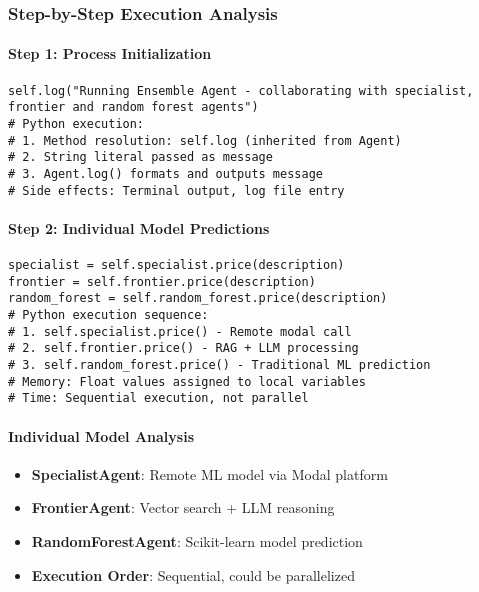 \subsubsection{Step-by-Step Execution Analysis}

\paragraph{Step 1: Process Initialization}
\begin{lstlisting}[caption=Logging and Setup]
self.log("Running Ensemble Agent - collaborating with specialist, frontier and random forest agents")
# Python execution:
# 1. Method resolution: self.log (inherited from Agent)
# 2. String literal passed as message
# 3. Agent.log() formats and outputs message
# Side effects: Terminal output, log file entry
\end{lstlisting}

\paragraph{Step 2: Individual Model Predictions}
\begin{lstlisting}[caption=Parallel Model Invocation]
specialist = self.specialist.price(description)
frontier = self.frontier.price(description)
random_forest = self.random_forest.price(description)
# Python execution sequence:
# 1. self.specialist.price() - Remote modal call
# 2. self.frontier.price() - RAG + LLM processing
# 3. self.random_forest.price() - Traditional ML prediction
# Memory: Float values assigned to local variables
# Time: Sequential execution, not parallel
\end{lstlisting}

\paragraph{Individual Model Analysis}
\begin{itemize}
\item \textbf{SpecialistAgent}: Remote ML model via Modal platform
\item \textbf{FrontierAgent}: Vector search + LLM reasoning
\item \textbf{RandomForestAgent}: Scikit-learn model prediction
\item \textbf{Execution Order}: Sequential, could be parallelized
\end{itemize}

